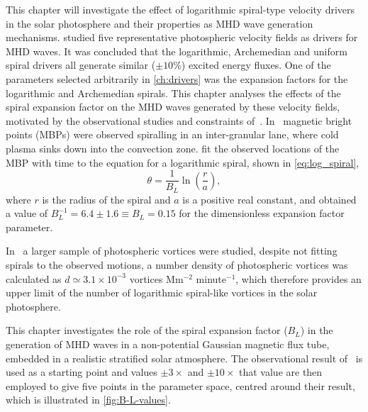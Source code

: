 \documentclass[a4paper,12pt,fourier,authoryear,custommargin]{Classes/PhDThesisPSnPDF}
\begin{document}
This chapter will investigate the effect of logarithmic spiral-type velocity drivers in the solar photosphere and their properties as MHD wave generation mechanisms.
 studied five representative photospheric velocity fields as drivers for MHD waves.
It was concluded that the logarithmic, Archemedian and uniform spiral drivers all generate similar ($\pm 10\%$) excited energy fluxes.
One of the parameters selected arbitrarily in \cref{ch:drivers} was the expansion factors for the logarithmic and Archemedian spirals.
This chapter analyses the effects of the spiral expansion factor on the MHD waves generated by these velocity fields, motivated by the observational studies and constraints of~\cite{bonet2008}.
In~\cite{bonet2008} magnetic bright points (MBPs) were observed spiralling in an inter-granular lane, where cold plasma sinks down into the convection zone.
\cite{bonet2008} fit the observed locations of the MBP with time to the equation for a logarithmic spiral, shown in \cref{eq:log_spiral},
\begin{equation}
\theta = \frac{1}{B_L}\ln\left(\frac{r}{a}\right),
\label{eq:log_spiral}
\end{equation}
\citep{feynman1964} where $r$ is the radius of the spiral and $a$ is a positive real constant, and obtained a value of $B_L^{-1} = 6.4 \pm 1.6 \equiv B_L = 0.15$ for the dimensionless expansion factor parameter.

In~\cite{bonet2010} a larger sample of photospheric vortices were studied, despite not fitting spirals to the observed motions, a number density of photospheric vortices was calculated as $d \simeq 3.1 \times 10^{-3}$ vortices Mm$^{-2}$ minute$^{-1}$, which therefore provides an upper limit of the number of logarithmic spiral-like vortices in the solar photosphere.

This chapter investigates the role of the spiral expansion factor ($B_L$) in the generation of MHD waves in a non-potential Gaussian magnetic flux tube, embedded in a realistic stratified solar atmosphere.
The observational result of~\cite{bonet2008} is used as a starting point and values $\pm 3\times$ and $\pm 10\times$ that value are then employed to give five points in the parameter space, centred around their result, which is illustrated in \cref{fig:B-L-values}.
\end{document}
